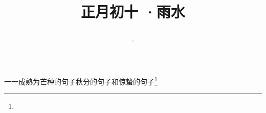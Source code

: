 \title{\date[d=19,m=2,y=2024][year:cn-y,年,month:cn,day:cn,日,·,weekday]·正月初十 ·雨水}
一一成熟为芒种的句子秋分的句子和惊蛰的句子\footnote{ }

